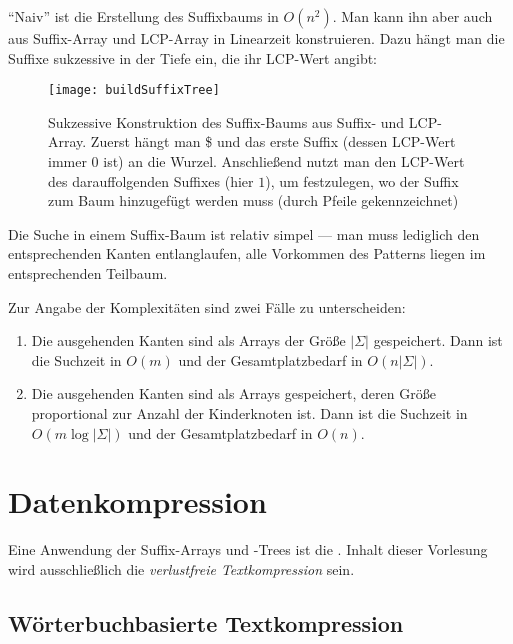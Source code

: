 ``Naiv'' ist die Erstellung des Suffixbaums in \( O(n^2) \). Man kann ihn aber auch aus Suffix-Array und LCP-Array in Linearzeit konstruieren. Dazu hängt man die Suffixe sukzessive in der Tiefe ein, die ihr LCP-Wert angibt:

\begin{figure}[H]
  \texttt{[image: buildSuffixTree]}
  \captionsetup{width=.8\textwidth}
  \caption{Sukzessive Konstruktion des Suffix-Baums aus Suffix- und LCP-Array. Zuerst hängt man \$ und das erste Suffix (dessen LCP-Wert immer \( 0 \) ist) an die Wurzel. Anschließend nutzt man den LCP-Wert des darauffolgenden Suffixes (hier \( 1 \)), um festzulegen, wo der Suffix zum Baum hinzugefügt werden muss (durch Pfeile gekennzeichnet)}
\end{figure}

Die Suche in einem Suffix-Baum ist relativ simpel --- man muss lediglich den entsprechenden Kanten entlanglaufen, alle Vorkommen des Patterns liegen im entsprechenden Teilbaum.

Zur Angabe der Komplexitäten sind zwei Fälle zu unterscheiden:

\begin{enumerate}
  \item Die ausgehenden Kanten sind als Arrays der Größe \( \left\vert \Sigma \right\vert \) gespeichert. Dann ist die Suchzeit in \textcolor{green!60!black}{\( O(m) \)} und der Gesamtplatzbedarf in \textcolor{red!80!black}{\( O(n\left\vert \Sigma \right\vert) \)}.
  \item Die ausgehenden Kanten sind als Arrays gespeichert, deren Größe proportional zur Anzahl der Kinderknoten ist. Dann ist die Suchzeit in \textcolor{red!80!black}{\( O(m\log \left\vert \Sigma \right\vert ) \)} und der Gesamtplatzbedarf in \textcolor{green!60!black}{\( O(n) \)}.
\end{enumerate}

\section{Datenkompression}

Eine Anwendung der Suffix-Arrays und -Trees ist die . Inhalt dieser Vorlesung wird ausschließlich die \emph{verlustfreie Textkompression} sein.

\subsection{Wörterbuchbasierte Textkompression}

